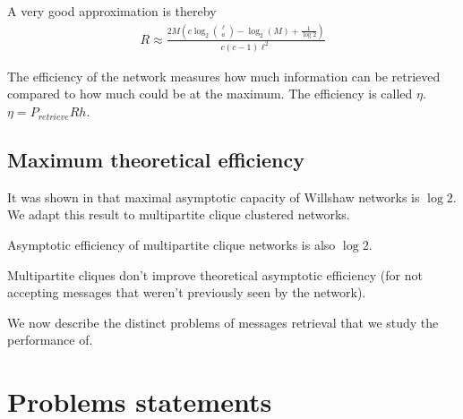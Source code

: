\documentclass[english,10pt,twocolumn]{IEEEtran}
\theoremstyle{definition}
\begin{document}
		A very good approximation is thereby \begin{align}
		R \approx \frac{2M \left(c \log_2{\ell \choose a } - \log_2(M) + \frac{1}{\log 2} \right)}{c(c-1)\ell^2}
		\label{rateth}
		\end{align}
		
		
		
		The efficiency of the network measures how much information can be retrieved compared to how much could be at the maximum. The efficiency is called $\eta$. $\eta = P_{retrieve} R  h$. 
		
	
	\subsection{Maximum theoretical efficiency}
		It was shown in \cite{Palm1980} that maximal asymptotic capacity of Willshaw networks is $\log 2$. We adapt this result to multipartite clique clustered networks.
		
		Asymptotic efficiency of multipartite clique networks is also $\log 2$.
		
		Multipartite cliques don't improve theoretical asymptotic efficiency (for not accepting messages that weren't previously seen by the network).


	We now describe the distinct problems of messages retrieval that we study the performance of.	
	
	\section{Problems statements}		
	
	\label{pstat}	
	
\end{document}
